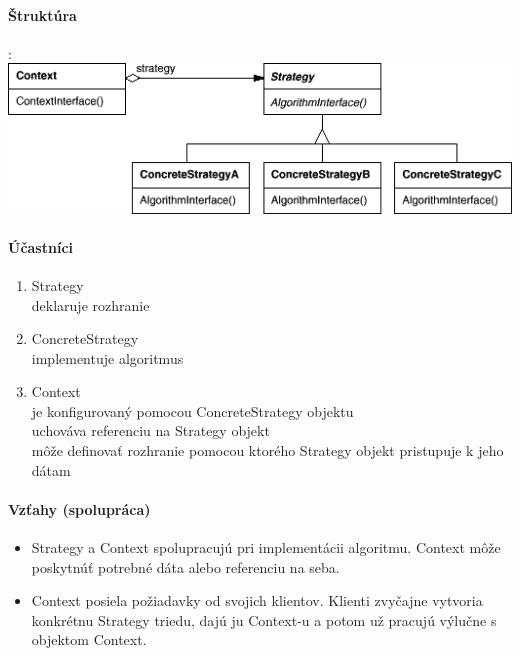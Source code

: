 		\paragraph{Štruktúra}:\\

			\includegraphics[width=.9\textwidth]{images/strategy2}

		\paragraph{Účastníci}
			\begin{enumerate}
				\item Strategy\\
				deklaruje rozhranie
				\item ConcreteStrategy\\
				implementuje algoritmus
				\item Context\\
				je konfigurovaný pomocou ConcreteStrategy objektu\\
				uchováva referenciu na Strategy objekt\\
				môže definovať rozhranie pomocou ktorého Strategy objekt pristupuje k jeho dátam
			\end{enumerate}
		\paragraph{Vzťahy (spolupráca)}
			\begin{itemize}
			\item Strategy a Context spolupracujú pri implementácii algoritmu. Context môže poskytnúť potrebné dáta alebo referenciu na seba.
			\item Context posiela požiadavky od svojich klientov. Klienti zvyčajne vytvoria konkrétnu Strategy triedu, dajú ju Context-u a potom už pracujú výlučne s objektom Context.
			\end{itemize}

